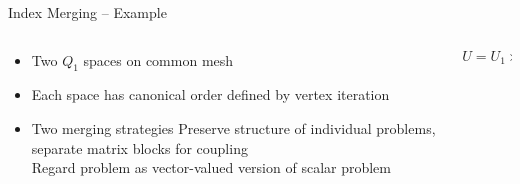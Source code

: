\documentclass[ignorenonframetext,11pt]{beamer}
\theoremstyle{definition}
\begin{document}
\begin{frame}{Index Merging -- Example}
  \begin{columns}
    \begin{column}{0.5\textwidth}
      \begin{itemize}
      \item Two $Q_1$ spaces on common mesh
      \item Each space has canonical order defined by vertex iteration
      \item Two merging strategies
         Preserve structure of individual problems, separate matrix blocks for coupling\\
         Regard problem as vector-valued version of scalar problem
      \end{itemize}
% 
% 

    \end{column}
    \begin{column}{0.5\textwidth}
{\Large
\begin{equation*}
U = U_1 \times U_2
\end{equation*}}\vspace*{.5em}
\resizebox{\textwidth}{!}{

}

    \end{column}
  \end{columns}
\end{frame}
\end{document}
